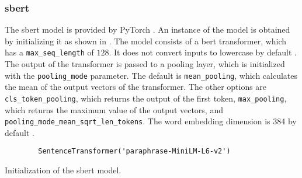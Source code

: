 \subsubsection*{\ac{sbert}}\label{subsubsec:impl-sbert}

The \ac{sbert} model is provided by PyTorch \cite{HfsentTrans2019}.
An instance of the model is obtained by initializing it as shown in .
The model consists of a \ac{bert} transformer, which has a \texttt{max\_seq\_length} of $128$. 
It does not convert inputs to lowercase by default \cite{sbert-dev}.
The output of the transformer is passed to a pooling layer, which is initialized with the \texttt{pooling\_mode} parameter.
The default is \texttt{mean\_pooling}, which calculates the mean of the output vectors of the transformer.
The other options are \texttt{cls\_token\_pooling}, which returns the output of the first token, 
\texttt{max\_pooling}, which returns the maximum value of the output vectors,
and \texttt{pooling\_mode\_mean\_sqrt\_len\_tokens}.
The word embedding dimension is 384 by default \cite{sbert-dev}.

\begin{listing}[htp]
    \begin{verbatim}
        SentenceTransformer('paraphrase-MiniLM-L6-v2')
    \end{verbatim}
    \caption[Initialization of the \ac{sbert} model]{Initialization of the \ac{sbert} model.
    }
    \label{lst:impl-sbert}
\end{listing}